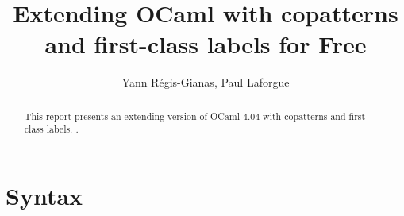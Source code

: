 \documentclass[acmlarge]{acmart}
\begin{document}
\title{Extending OCaml with copatterns and first-class labels for Free}
\author{Yann R\'{e}gis-Gianas, Paul Laforgue}

\maketitle


\begin{abstract}
  This report presents an extending version of OCaml 4.04 with copatterns
  \citep{abel2013copatterns} and first-class labels.
  \citep{leijen2005extensible}.
\end{abstract}





\section{Syntax}

\newpage



\end{document}

